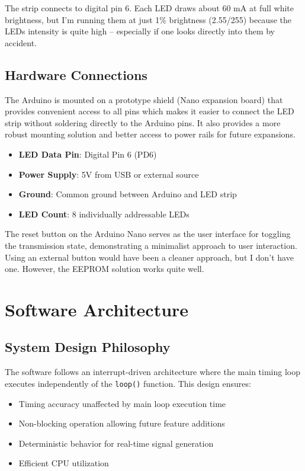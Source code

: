 \documentclass[report]{IEEEtran}
\begin{document}
The strip connects to digital pin 6. 
Each LED draws about 60 mA at full white brightness, but I'm running them at just 1\% brightness (2.55/255) because the LEDs intensity is quite high -- especially if one looks directly into them by accident. 

\subsection{Hardware Connections}
The Arduino is mounted on a prototype shield (Nano expansion board) that provides convenient access to all pins which makes it easier to connect the LED strip without soldering directly to the Arduino pins. It also provides a more robust mounting solution and better access to power rails for future expansions.
\begin{itemize}
    \item \textbf{LED Data Pin}: Digital Pin 6 (PD6)
    \item \textbf{Power Supply}: 5V from USB or external source
    \item \textbf{Ground}: Common ground between Arduino and LED strip
    \item \textbf{LED Count}: 8 individually addressable LEDs
\end{itemize}

The reset button on the Arduino Nano serves as the user interface for toggling the transmission state, demonstrating a minimalist approach to user interaction. Using an external button would have been a cleaner approach, but I don't have one. However, the EEPROM solution works quite well. 

\section{Software Architecture}

\subsection{System Design Philosophy}
The software follows an interrupt-driven architecture where the main timing loop executes independently of the \texttt{loop()} function. This design ensures:
\begin{itemize}
    \item Timing accuracy unaffected by main loop execution time
    \item Non-blocking operation allowing future feature additions
    \item Deterministic behavior for real-time signal generation
    \item Efficient CPU utilization
\end{itemize}
\end{document}
